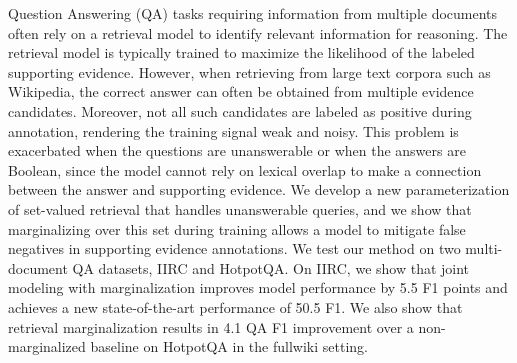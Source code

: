 Question Answering (QA) tasks requiring information from multiple documents often rely on a retrieval model to identify relevant information for reasoning. The retrieval model is typically trained to maximize the likelihood of the labeled supporting evidence. However, when retrieving from large text corpora such as Wikipedia, the correct answer can often be obtained from multiple evidence candidates. Moreover, not all such candidates are labeled as positive during annotation, rendering the training signal weak and noisy. This problem is exacerbated when the questions are unanswerable or when the answers are Boolean, since the model cannot rely on lexical overlap to make a connection between the answer and supporting evidence. We develop a new parameterization of set-valued retrieval that handles unanswerable queries, and we show that marginalizing over this set during training allows a model to mitigate false negatives in supporting evidence annotations. We test our method on two multi-document QA datasets, IIRC and HotpotQA. On IIRC, we show that joint modeling with marginalization improves model performance by 5.5 F1 points and achieves a new state-of-the-art performance of 50.5 F1. We also show that retrieval marginalization results in 4.1 QA F1 improvement over a non-marginalized baseline on HotpotQA in the fullwiki setting.

